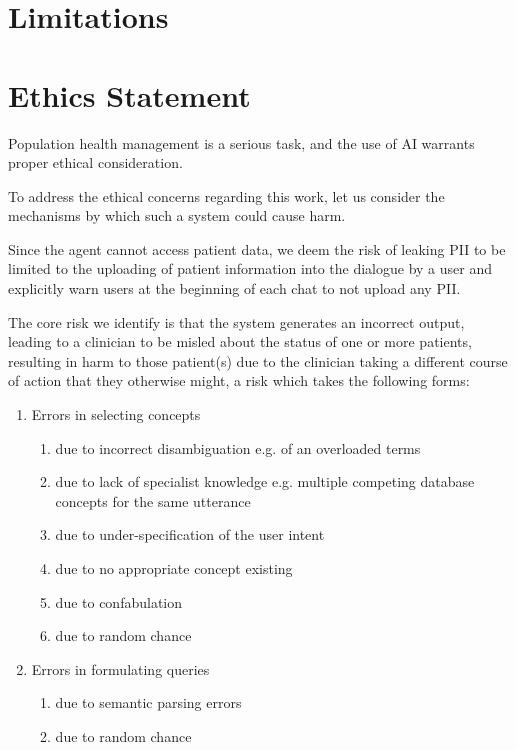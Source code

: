 \documentclass[11pt]{article}
\begin{document}
\section{Limitations}

\section{Ethics Statement}
Population health management is a serious task, and the use of AI warrants proper ethical consideration.

To address the ethical concerns regarding this work, let us consider the mechanisms by which such a system could cause harm.

Since the agent cannot access patient data, we deem the risk of leaking PII to be limited to the uploading of patient information into the dialogue by a user and explicitly warn users at the beginning of each chat to not upload any PII.

The core risk we identify is that the system generates an incorrect output, leading to a clinician to be misled about the status of one or more patients, resulting in harm to those patient(s) due to the clinician taking a different course of action that they otherwise might, a risk which takes the following forms:

\begin{enumerate}
	\item Errors in selecting concepts
	\begin{enumerate}
		\item due to incorrect disambiguation e.g. of an overloaded terms
		\item due to lack of specialist knowledge e.g. multiple competing database concepts for the same utterance   
		\item due to under-specification of the user intent
		\item due to no appropriate concept existing 
		\item due to confabulation
		\item due to random chance
	\end{enumerate}
	\item Errors in formulating queries
	\begin{enumerate}
		\item due to semantic parsing errors 
		\item due to random chance
	\end{enumerate}
\end{enumerate}
\end{document}
